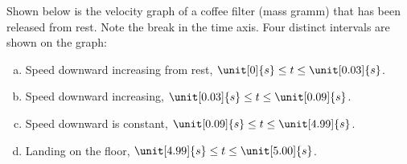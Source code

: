 \label{fnt8.2.1-5}

Shown below is the velocity graph of a coffee filter (mass \unit[1]{gramm}) that has been released from rest. Note the break in the time axis. Four distinct intervals are shown on the graph:
\begin{enumerate}[(a)]
	\item Speed downward increasing from rest, $\unit[0]{s} \leq t \leq \unit[0.03]{s}$.
	\item Speed downward increasing, $\unit[0.03]{s} \leq t \leq \unit[0.09]{s}$.
	\item Speed downward is constant, $\unit[0.09]{s} \leq t \leq \unit[4.99]{s}$.
	\item Landing on the floor, $\unit[4.99]{s} \leq t \leq \unit[5.00]{s}$.
\end{enumerate}

\def\FunctionF(#1){-sqrt((2*.001*9.8)/(1.2*1.225*.13^2*pi))*tanh((#1)*sqrt((1.2*9.8*1.225*.13^2*pi)/(.002)))} %
\def\FunctionFa(#1){-10*(#1)} %
\def\FunctionFb(#1){-3.3*(#1)-.215} %
\def\FunctionG(#1){-0.5} %
\def\FunctionH(#1){50*(#1)-250} %

